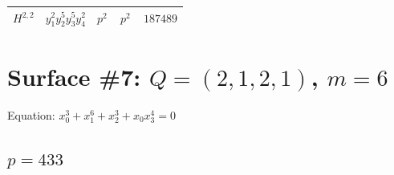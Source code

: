 \documentclass[11pt]{article}
\begin{document}
\begin{table}[ht]
{\begin{tabular}{@{}lllll@{}}
\midrule
$H^{2,2}$ & $y_{1}^{2} y_{2}^{5} y_{3}^{5} y_{4}^{2}$ & $p^{2} \,$ & $p^{2} \,$ & $187489$ \\
\bottomrule
\end{tabular}
}
\renewcommand{\arraystretch}{1.0}
\end{table}

\newpage

\section*{Surface \#7: $Q=(2, 1, 2, 1)$, $m=6$}

Equation: $x_0^{3} + x_1^{6} + x_2^{3} + x_0 x_3^{4} = 0$

\subsection*{$p = 433$}
\end{document}

